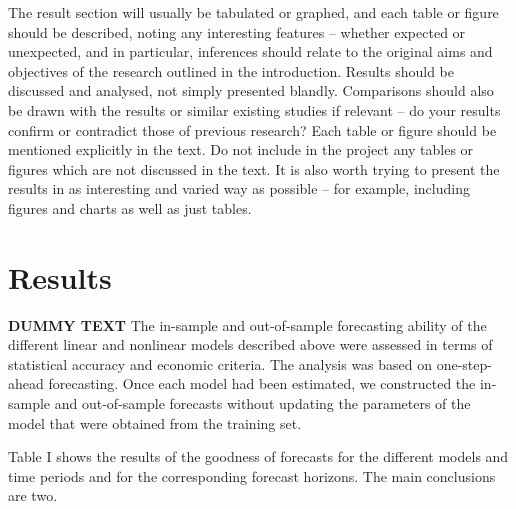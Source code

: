 The result section will usually be tabulated or graphed, and each table or figure should be described, noting any interesting features – whether expected or unexpected, and in particular, inferences should relate to the original aims and objectives of the research outlined in the introduction. Results should be discussed and analysed, not simply presented blandly. Comparisons should also be drawn with the results or similar existing studies if relevant – do your results confirm or contradict those of previous research? Each table or figure should be mentioned explicitly in the text. Do not include in the project any tables or figures which are not discussed in the text. It is also worth trying to present the results in as interesting and varied way as possible – for example, including figures and charts as well as just tables.


\chapter{Results}

\textbf{DUMMY TEXT}
The in-sample and out-of-sample forecasting ability of the different linear and nonlinear models described above were assessed in terms of statistical accuracy and economic criteria. The analysis was based on one-step-ahead forecasting. Once each model had been estimated, we constructed the in-sample and out-of-sample forecasts without updating the parameters of the model that were
obtained from the training set.

Table I shows the results of the goodness of forecasts for the different models and time periods and
for the corresponding forecast horizons. The main conclusions are two.




